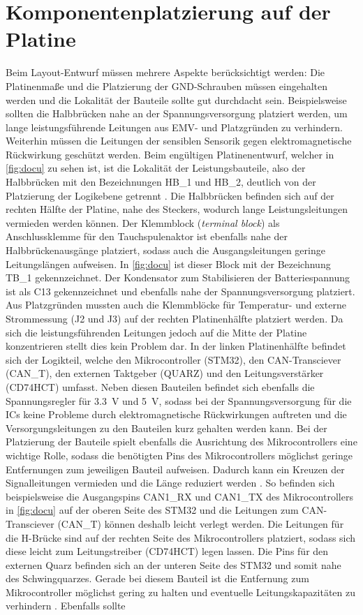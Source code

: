 \section{Komponentenplatzierung auf der Platine}\label{sec:bau}
Beim Layout-Entwurf müssen mehrere Aspekte berücksichtigt werden: Die Platinenmaße und die Platzierung der GND-Schrauben müssen eingehalten werden und die Lokalität der Bauteile sollte gut durchdacht sein. Beispielsweise sollten die Halbbrücken nahe an der Spannungsversorgung platziert werden, um lange leistungsführende Leitungen aus EMV- und Platzgründen zu verhindern. Weiterhin müssen die Leitungen der sensiblen Sensorik gegen elektromagnetische Rückwirkung geschützt werden. Beim engültigen Platinenentwurf, welcher in \autoref{fig:docu} zu sehen ist, ist die Lokalität der Leistungsbauteile, also der Halbbrücken mit den Bezeichnungen HB\_1 und HB\_2, deutlich von der Platzierung der Logikebene getrennt \cite[S.26]{emcdes}. Die Halbbrücken befinden sich auf der rechten Hälfte der Platine, nahe des Steckers, wodurch lange Leistungsleitungen vermieden werden können. Der Klemmblock (\textit{terminal block}) als Anschlussklemme für den Tauchspulenaktor ist ebenfalls nahe der Halbbrückenausgänge platziert, sodass auch die Ausgangsleitungen geringe Leitungslängen aufweisen. In \autoref{fig:docu} ist dieser Block mit der Bezeichnung TB\_1 gekennzeichnet. Der Kondensator zum Stabilisieren der Batteriespannung ist als C13 gekennzeichnet und ebenfalls nahe der Spannungsversorgung platziert. Aus Platzgründen mussten auch die Klemmblöcke für Temperatur- und externe Strommessung (J2 und J3) auf der rechten Platinenhälfte platziert werden. Da sich die leistungsführenden Leitungen jedoch auf die Mitte der Platine konzentrieren stellt dies kein Problem dar. In der linken Platinenhälfte befindet sich der Logikteil, welche den Mikrocontroller (STM32), den CAN-Transciever (CAN\_T), den externen Taktgeber (QUARZ) und den Leitungsverstärker (CD74HCT) umfasst. Neben diesen Bauteilen befindet sich ebenfalls die Spannungsregler für \SI{3,3}{V} und \SI{5}{V}, sodass bei der Spannungsversorgung für die ICs keine Probleme durch elektromagnetische Rückwirkungen auftreten und die Versorgungsleitungen zu den Bauteilen kurz gehalten werden kann. Bei der Platzierung der Bauteile spielt ebenfalls die Ausrichtung des Mikrocontrollers eine wichtige Rolle, sodass die benötigten Pins des Mikrocontrollers möglichst geringe Entfernungen zum jeweiligen Bauteil aufweisen. Dadurch kann ein Kreuzen der Signalleitungen vermieden und die Länge reduziert werden \cite[S.17]{emcdes}. So befinden sich beispielsweise die Ausgangspins CAN1\_RX und CAN1\_TX des Mikrocontrollers in \autoref{fig:docu} auf der oberen Seite des STM32 und die Leitungen zum CAN-Transciever (CAN\_T) können deshalb leicht verlegt werden. Die Leitungen für die H-Brücke sind auf der rechten Seite des Mikrocontrollers platziert, sodass sich diese leicht zum Leitungstreiber (CD74HCT) legen lassen. Die Pins für den externen Quarz befinden sich an der unteren Seite des STM32 und somit nahe des Schwingquarzes. Gerade bei diesem Bauteil ist die Entfernung zum Mikrocontroller möglichst gering zu halten und eventuelle Leitungskapazitäten zu verhindern \cite[S.31]{stmquarz}. Ebenfalls sollte 